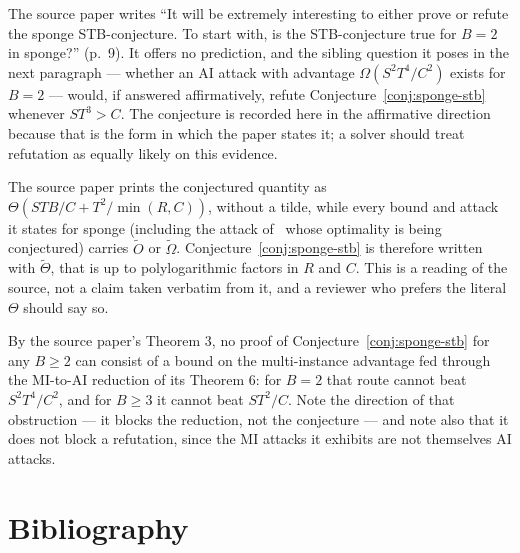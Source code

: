 \documentclass{aicr-conjecture}
\newcommand{\tO}{\tilde{O}}
\newcommand{\tOm}{\tilde{\Omega}}
\newcommand{\tTh}{\tilde{\Theta}}
\begin{document}
\begin{remark}\label{rem:direction}
The source paper writes ``It will be extremely interesting to either
prove or refute the sponge STB-conjecture. To start with, is the
STB-conjecture true for $B = 2$ in sponge?'' (p.~9). It offers no
prediction, and the sibling question it poses in the next paragraph
--- whether an AI attack with advantage $\Omega(S^{2}T^{4}/C^{2})$
exists for $B = 2$ --- would, if answered affirmatively, refute
Conjecture~\ref{conj:sponge-stb} whenever $ST^{3} > C$. The conjecture
is recorded here in the affirmative direction because that is the form
in which the paper states it; a solver should treat refutation as
equally likely on this evidence.
\end{remark}

\begin{remark}[$\tTh$ rather than $\Theta$]\label{rem:logs}
The source paper prints the conjectured quantity as
$\Theta(STB/C + T^{2}/\min(R,C))$, without a tilde, while every bound
and attack it states for sponge (including the attack
of~\cite{FGK22} whose optimality is being conjectured) carries
$\tO$ or $\tOm$. Conjecture~\ref{conj:sponge-stb} is therefore written
with $\tTh$, that is up to polylogarithmic factors in $R$ and $C$.
This is a reading of the source, not a claim taken verbatim from it,
and a reviewer who prefers the literal $\Theta$ should say so.
\end{remark}

\begin{remark}\label{rem:mi}
By the source paper's Theorem 3, no proof of
Conjecture~\ref{conj:sponge-stb} for any $B \ge 2$ can consist of a
bound on the multi-instance advantage fed through the MI-to-AI
reduction of its Theorem 6: for $B = 2$ that route cannot beat
$S^{2}T^{4}/C^{2}$, and for $B \ge 3$ it cannot beat $ST^{2}/C$. Note
the direction of that obstruction --- it blocks the reduction, not the
conjecture --- and note also that it does not block a refutation, since
the MI attacks it exhibits are not themselves AI attacks.
\end{remark}

\section{Bibliography}
\end{document}
